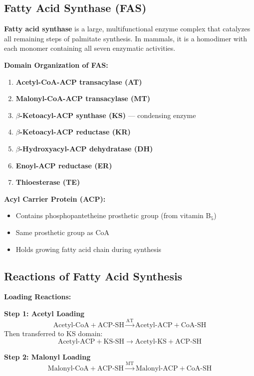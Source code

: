 \subsection{Fatty Acid Synthase (FAS)}

\begin{definition}
\textbf{Fatty acid synthase} is a large, multifunctional enzyme complex that catalyzes all remaining steps of palmitate synthesis. In mammals, it is a homodimer with each monomer containing all seven enzymatic activities.
\end{definition}

\textbf{Domain Organization of FAS:}

\begin{enumerate}
    \item \textbf{Acetyl-CoA-ACP transacylase (AT)}
    \item \textbf{Malonyl-CoA-ACP transacylase (MT)}
    \item \textbf{$\beta$-Ketoacyl-ACP synthase (KS)} — condensing enzyme
    \item \textbf{$\beta$-Ketoacyl-ACP reductase (KR)}
    \item \textbf{$\beta$-Hydroxyacyl-ACP dehydratase (DH)}
    \item \textbf{Enoyl-ACP reductase (ER)}
    \item \textbf{Thioesterase (TE)}
\end{enumerate}

\textbf{Acyl Carrier Protein (ACP):}
\begin{itemize}
    \item Contains phosphopantetheine prosthetic group (from vitamin B$_5$)
    \item Same prosthetic group as CoA
    \item Holds growing fatty acid chain during synthesis
\end{itemize}

\subsection{Reactions of Fatty Acid Synthesis}

\textbf{Loading Reactions:}

\textbf{Step 1: Acetyl Loading}
\[
\text{Acetyl-CoA} + \text{ACP-SH} \xrightarrow{\text{AT}} \text{Acetyl-ACP} + \text{CoA-SH}
\]
Then transferred to KS domain:
\[
\text{Acetyl-ACP} + \text{KS-SH} \rightarrow \text{Acetyl-KS} + \text{ACP-SH}
\]

\textbf{Step 2: Malonyl Loading}
\[
\text{Malonyl-CoA} + \text{ACP-SH} \xrightarrow{\text{MT}} \text{Malonyl-ACP} + \text{CoA-SH}
\]

